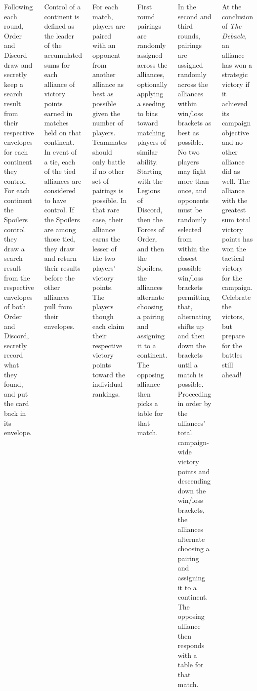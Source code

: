 \begin{columns}
\columnbreak

Following each round, Order and Discord draw and secretly keep a
search result from their respective envelopes for each continent they
control.  For each continent the Spoilers control they draw a search
result from the respective envelopes of both Order and Discord,
secretly record what they found, and put the card back in its
envelope.

Control of a continent is defined as the leader of the accumulated
sums for each alliance of victory points earned in matches held on
that continent.  In event of a tie, each of the tied alliances are
considered to have control.  If the Spoilers are among those tied,
they draw and return their results before the other alliances pull
from their envelopes.


For each match, players are paired with an opponent from another
alliance as best as possible given the number of players.  Teammates
should only battle if no other set of pairings is possible.  In that
rare case, their alliance earns the lesser of the two players' victory
points.  The players though each claim their respective victory points
toward the individual rankings.

First round pairings are randomly assigned across the alliances,
optionally applying a seeding to bias toward matching players of
similar ability.  Starting with the Legions of Discord, then the
Forces of Order, and then the Spoilers, the alliances alternate
choosing a pairing and assigning it to a continent.  The opposing
alliance then picks a table for that match.

In the second and third rounds, pairings are assigned randomly across
the alliances within win/loss brackets as best as possible.  No two
players may fight more than once, and opponents must be randomly
selected from within the closest possible win/loss brackets permitting
that, alternating shifts up and then down the brackets until a match
is possible.  Proceeding in order by the alliances' total
campaign-wide victory points and descending down the win/loss
brackets, the alliances alternate choosing a pairing and assigning it
to a continent.  The opposing alliance then responds with a table for
that match.




At the conclusion of \emph{The Debacle}, an alliance has won a
strategic victory if it achieved its campaign objective and no other
alliance did as well.  The alliance with the greatest sum total
victory points has won the tactical victory for the campaign.
Celebrate the victors, but prepare for the battles still ahead!

\end{columns}

